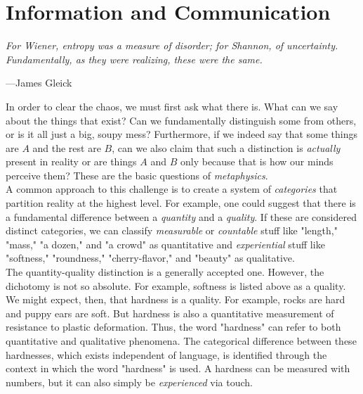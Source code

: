 \toclineskip
\section{Information and Communication}

\vspace{4mm}
\begin{displayquote}
	\textit{For Wiener, entropy was a measure of disorder; for Shannon, of uncertainty. Fundamentally, as they were realizing, these were the same.}
	\begin{flushright}
		---James Gleick
	\end{flushright}
\end{displayquote}
\vspace{4mm}


In order to clear the chaos, we must first ask what there is. What can we say about the things that exist? Can we fundamentally distinguish some from others, or is it all just a big, soupy mess? Furthermore, if we indeed say that some things are $A$ and the rest are $B$, can we also claim that such a distinction is \textit{actually} present in reality or are things $A$ and $B$ only because that is how our minds perceive them? These are the basic questions of \textit{metaphysics}. \\

A common approach to this challenge is to create a system of \textit{categories} that partition reality at the highest level. For example, one could suggest that there is a fundamental difference between a \textit{quantity} and a \textit{quality}. If these are considered distinct categories, we can classify \textit{measurable} or \textit{countable} stuff like "length," "mass," "a dozen," and "a crowd" as quantitative and \textit{experiential} stuff like "softness," "roundness," "cherry-flavor," and "beauty" as qualitative. \\

The quantity-quality distinction is a generally accepted one. However, the dichotomy is not so absolute. For example, softness is listed above as a quality. We might expect, then, that hardness is a quality. For example, rocks are hard and puppy ears are soft. But hardness is also a quantitative measurement of resistance to plastic deformation. Thus, the word "hardness" can refer to both quantitative and qualitative phenomena. The categorical difference between these hardnesses, which exists independent of language, is identified through the context in which the word "hardness" is used. A hardness can be measured with numbers, but it can also simply be \textit{experienced} via touch. \\

